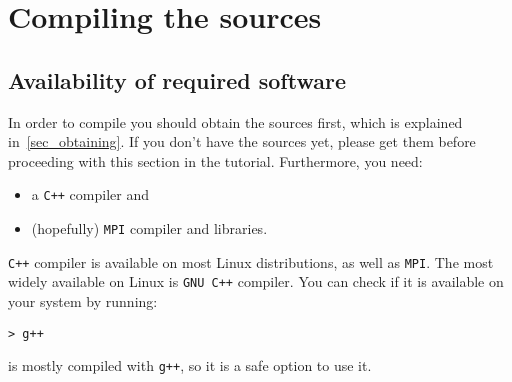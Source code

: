 \section{Compiling the sources}
\label{sec_compiling}

\subsection{Availability of required software}

In order to compile {\psiboil} you should obtain the sources first, which
is explained in~\ref{sec_obtaining}. If you don't have the sources yet, please
get them before proceeding with this section in the tutorial. Furthermore,
you need:
%
\begin{itemize}
   \item a {\tt C++} compiler and
   \item (hopefully) {\tt MPI} compiler and libraries.
\end{itemize}
%
{\tt C++} compiler is available on most Linux distributions, as well as 
{\tt MPI}. The most widely available on Linux is {\tt GNU C++} compiler. 
You can check if it is available on your system by running:
%
\begin{verbatim}
> g++
\end{verbatim}
%
{\psiboil} is mostly compiled with {\tt g++}, so it is a safe option 
to use it. 

